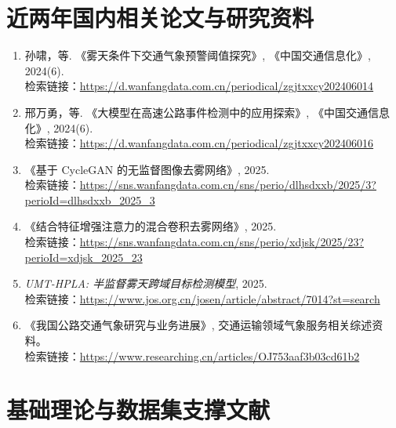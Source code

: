 \section{近两年国内相关论文与研究资料}

\begin{enumerate}[leftmargin=2.5em]
\item 孙啸，等. 《雾天条件下交通气象预警阈值探究》, 《中国交通信息化》, 2024(6). \\
  检索链接：\url{https://d.wanfangdata.com.cn/periodical/zgjtxxcy202406014}
\item 邢万勇，等. 《大模型在高速公路事件检测中的应用探索》, 《中国交通信息化》, 2024(6). \\
  检索链接：\url{https://d.wanfangdata.com.cn/periodical/zgjtxxcy202406016}
\item 《基于 CycleGAN 的无监督图像去雾网络》, 2025. \\
  检索链接：\url{https://sns.wanfangdata.com.cn/sns/perio/dlhsdxxb/2025/3?perioId=dlhsdxxb_2025_3}
\item 《结合特征增强注意力的混合卷积去雾网络》, 2025. \\
  检索链接：\url{https://sns.wanfangdata.com.cn/sns/perio/xdjsk/2025/23?perioId=xdjsk_2025_23}
\item \emph{UMT-HPLA: 半监督雾天跨域目标检测模型}, 2025. \\
  检索链接：\url{https://www.jos.org.cn/josen/article/abstract/7014?st=search}
\item 《我国公路交通气象研究与业务进展》, 交通运输领域气象服务相关综述资料。 \\
  检索链接：\url{https://www.researching.cn/articles/OJ753aaf3b03cd61b2}
\end{enumerate}

\section{基础理论与数据集支撑文献}

